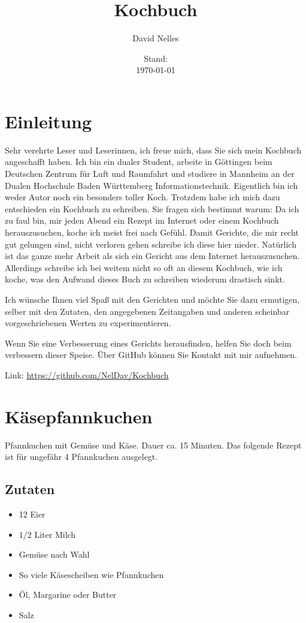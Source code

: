 \documentclass[12pt,a4paper,titlepage,parskip]{scrartcl}
\author{David Nelles}
\title{Kochbuch}
\date{Stand: \\ \today}
\begin{document}
	\maketitle
	\section{Einleitung}
	Sehr verehrte Leser und Leserinnen, ich freue mich, dass Sie sich mein Kochbuch angeschafft haben. Ich bin ein dualer Student, arbeite in Göttingen beim Deutschen Zentrum für Luft und Raumfahrt und studiere in Mannheim an der Dualen Hochschule Baden Württemberg Informationstechnik. Eigentlich bin ich weder Autor noch ein besonders toller Koch. Trotzdem habe ich mich dazu entschieden ein Kochbuch zu schreiben. Sie fragen sich bestimmt warum: Da ich zu faul bin, mir jeden Abend ein Rezept im Internet oder einem Kochbuch herauszusuchen, koche ich meist frei nach Gefühl. Damit Gerichte, die mir recht gut gelungen sind, nicht verloren gehen schreibe ich diese hier nieder. Natürlich ist das ganze mehr Arbeit als sich ein Gericht aus dem Internet herauszusuchen. Allerdings schreibe ich bei weitem nicht so oft an diesem Kochbuch, wie ich koche, was den Aufwand dieses Buch zu schreiben wiederum drastisch sinkt.
	
	Ich wünsche Ihnen viel Spaß mit den Gerichten und möchte Sie dazu ermutigen, selber mit den Zutaten, den angegebenen Zeitangaben und anderen scheinbar vorgeschriebenen Werten zu experimentieren.
	
	Wenn Sie eine Verbesserung eines Gerichts herausfinden, helfen Sie doch beim verbessern dieser Speise. Über GitHub können Sie Kontakt mit mir aufnehmen.
	
	Link: \href{https://github.com/NelDav/Kochbuch}{https://github.com/NelDav/Kochbuch}
	\newpage
	\section{Käsepfannkuchen}
	Pfannkuchen mit Gemüse und Käse. Dauer ca. 15 Minuten. Das folgende Rezept ist für ungefähr 4 Pfannkuchen ausgelegt.
	\subsection{Zutaten}
	\begin{itemize}
		\item 12 Eier
		\item $1/2$ Liter Milch
		\item Gemüse nach Wahl
		\item So viele Käsescheiben wie Pfannkuchen
		\item Öl, Margarine oder Butter
		\item Salz
	\end{itemize}
\end{document}
